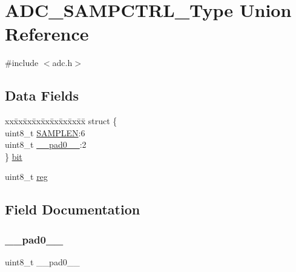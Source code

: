 \hypertarget{union_a_d_c___s_a_m_p_c_t_r_l___type}{}\section{A\+D\+C\+\_\+\+S\+A\+M\+P\+C\+T\+R\+L\+\_\+\+Type Union Reference}
\label{union_a_d_c___s_a_m_p_c_t_r_l___type}


{\ttfamily \#include $<$adc.\+h$>$}

\subsection*{Data Fields}
\begin{DoxyCompactItemize}
\item 
\begin{tabbing}
xx\=xx\=xx\=xx\=xx\=xx\=xx\=xx\=xx\=\kill
struct \{\\
\>uint8\_t \mbox{\hyperlink{union_a_d_c___s_a_m_p_c_t_r_l___type_a50450a83d6834605e4e113ece0ab9aad}{SAMPLEN}}:6\\
\>uint8\_t \mbox{\hyperlink{union_a_d_c___s_a_m_p_c_t_r_l___type_a8b4eebe79ded0459acec2f4950102ba3}{\_\_pad0\_\_}}:2\\
\} \mbox{\hyperlink{union_a_d_c___s_a_m_p_c_t_r_l___type_a383c0f732ac9988a1ae4c4e649468d01}{bit}}\\

\end{tabbing}\item 
uint8\+\_\+t \mbox{\hyperlink{union_a_d_c___s_a_m_p_c_t_r_l___type_a9428adc9af4653a2050e2536b55dec8d}{reg}}
\end{DoxyCompactItemize}


\subsection{Field Documentation}
\mbox{\label{union_a_d_c___s_a_m_p_c_t_r_l___type_a8b4eebe79ded0459acec2f4950102ba3}} 
\subsubsection{\texorpdfstring{\_\_pad0\_\_}{\_\_pad0\_\_}}
{\footnotesize\ttfamily uint8\+\_\+t \+\_\+\+\_\+pad0\+\_\+\+\_\+}

